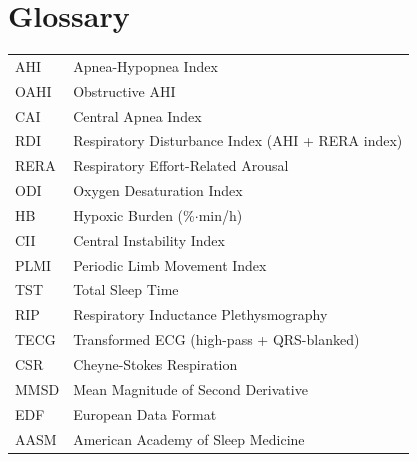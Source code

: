 \documentclass[11pt,a4paper]{article}
\begin{document}
\section*{Glossary}

\begin{tabular}{@{}lp{10cm}@{}}
AHI & Apnea-Hypopnea Index \\
OAHI & Obstructive AHI \\
CAI & Central Apnea Index \\
RDI & Respiratory Disturbance Index (AHI + RERA index) \\
RERA & Respiratory Effort-Related Arousal \\
ODI & Oxygen Desaturation Index \\
HB & Hypoxic Burden (\%$\cdot$min/h) \\
CII & Central Instability Index \\
PLMI & Periodic Limb Movement Index \\
TST & Total Sleep Time \\
RIP & Respiratory Inductance Plethysmography \\
TECG & Transformed ECG (high-pass + QRS-blanked) \\
CSR & Cheyne-Stokes Respiration \\
MMSD & Mean Magnitude of Second Derivative \\
EDF & European Data Format \\
AASM & American Academy of Sleep Medicine \\
\end{tabular}
\end{document}
